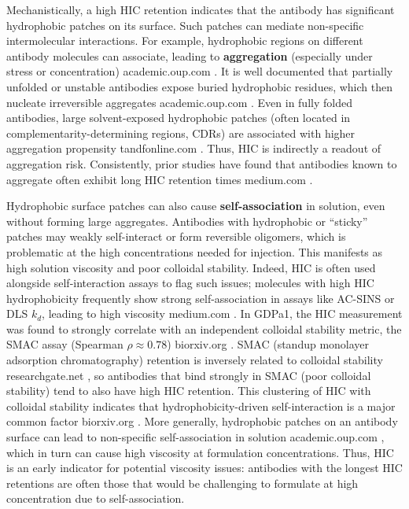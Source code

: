 \documentclass[12pt]{article}
\begin{document}
Mechanistically, a high HIC retention indicates that the antibody has significant hydrophobic patches on its surface. Such patches can mediate non-specific intermolecular interactions. For example, hydrophobic regions on different antibody molecules can associate, leading to \textbf{aggregation} (especially under stress or concentration)
academic.oup.com
. It is well documented that partially unfolded or unstable antibodies expose buried hydrophobic residues, which then nucleate irreversible aggregates
academic.oup.com
. Even in fully folded antibodies, large solvent-exposed hydrophobic patches (often located in complementarity-determining regions, CDRs) are associated with higher aggregation propensity
tandfonline.com
. Thus, HIC is indirectly a readout of aggregation risk. Consistently, prior studies have found that antibodies known to aggregate often exhibit long HIC retention times
medium.com
.

Hydrophobic surface patches can also cause \textbf{self-association} in solution, even without forming large aggregates. Antibodies with hydrophobic or “sticky” patches may weakly self-interact or form reversible oligomers, which is problematic at the high concentrations needed for injection. This manifests as high solution viscosity and poor colloidal stability. Indeed, HIC is often used alongside self-interaction assays to flag such issues; molecules with high HIC hydrophobicity frequently show strong self-association in assays like AC-SINS or DLS $k_d$, leading to high viscosity
medium.com
. In GDPa1, the HIC measurement was found to strongly correlate with an independent colloidal stability metric, the SMAC assay (Spearman $\rho\approx0.78$)
biorxiv.org
. SMAC (standup monolayer adsorption chromatography) retention is inversely related to colloidal stability
researchgate.net
, so antibodies that bind strongly in SMAC (poor colloidal stability) tend to also have high HIC retention. This clustering of HIC with colloidal stability indicates that hydrophobicity-driven self-interaction is a major common factor
biorxiv.org
. More generally, hydrophobic patches on an antibody surface can lead to non-specific self-association in solution
academic.oup.com
, which in turn can cause high viscosity at formulation concentrations. Thus, HIC is an early indicator for potential viscosity issues: antibodies with the longest HIC retentions are often those that would be challenging to formulate at high concentration due to self-association.
\end{document}

